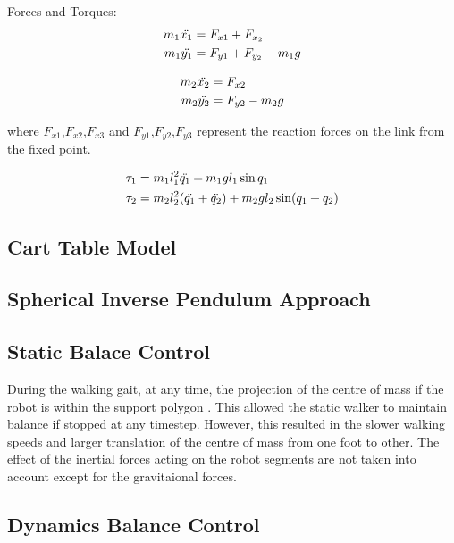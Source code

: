 Forces and Torques:
\begin{equation}
\begin{split}
    m_1\Ddot{x_1} &= F_{x1} + F_{x_2} \\
    m_1\Ddot{y_1} &= F_{y1} + F_{y_2} - m_1g
\end{split}
\end{equation}

\begin{equation}
\begin{split}
    m_2\Ddot{x_2} &= F_{x2} \\
    m_2\Ddot{y_2} &= F_{y2} - m_2g
\end{split}
\end{equation}

where $F_{x1}$,$F_{x2}$,$F_{x3}$ and $F_{y1}$,$F_{y2}$,$F_{y3}$ represent the reaction forces on the link from the fixed point.

\begin{equation}
\begin{split}
    \tau_1 &= m_1l_1^2\Ddot{q_1} + m_1gl_1\sin{q_1} \\
    \tau_2 &= m_2l_2^2 (\Ddot{q_1} + \Ddot{q_2}) + m_2gl_2\sin(q_1+q_2)
\end{split}
\end{equation}

\subsection{Cart Table Model}


\subsection{Spherical Inverse Pendulum Approach}

\subsection{Static Balace Control}

During the walking gait, at any time, the projection of the centre of mass if the robot is within the support
polygon \cite{katic2003survey}. This allowed the static walker to maintain balance if stopped at any timestep.
However, this resulted in the slower walking speeds and larger translation of the centre of mass from one foot to
other. The effect of the inertial forces acting on the robot segments are not taken into account except for the 
gravitaional forces.

\subsection{ Dynamics Balance Control}

